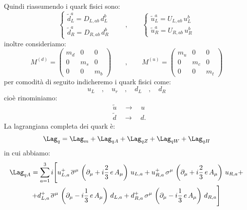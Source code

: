 Quindi riassumendo i quark fisici sono:
\begin{equation}
    \begin{cases}
        \tilde{d}_L^a = D_{L,ab}\, d_L^b \\
        \tilde{d}_R^a = D_{R,ab}\, d_R^b
    \end{cases} \qquad , \qquad \begin{cases}
        \tilde{u}_L^a = U_{L,ab}\, u_L^b \\
        \tilde{u}_R^a = U_{R,ab}\, u_R^b
    \end{cases}
\end{equation}
inoltre consideriamo:
\begin{equation}
    M^{(d)} = \begin{pmatrix}
        m_d & 0 & 0 \\
        0 & m_s & 0 \\
        0 & 0 & m_b
    \end{pmatrix} \qquad , \qquad M^{(u)} = \begin{pmatrix}
        m_u & 0 & 0 \\
        0 & m_c & 0 \\
        0 & 0 & m_t
    \end{pmatrix}
\end{equation}
per comodità di seguito indicheremo i quark fisici come:
\begin{equation}
    u_L \quad , \quad u_r \quad , \quad d_L \quad , \quad d_R
\end{equation}
cioè rinominiamo:
\begin{align}
    &\tilde{u} \quad \longrightarrow \quad u \\
    &\tilde{d} \quad \longrightarrow \quad d.
\end{align}
La lagrangiana completa dei quark è:
\begin{equation}
    \Lag_q = \Lag_m + \Lag_{qA} + \Lag_{qZ} + \Lag_{qW} + \Lag_{qH}
\end{equation}
in cui abbiamo:
\begin{multline}
    \Lag_{qA} = \sum_{a=1}^3 i \Bigg[ u_{L,a}^+\, \overline{\sigma}^\mu\, \left(\partial_\mu + i\frac{2}{3}\, e\, A_\mu\right)\, u_{L,a} + u_{R,a}^+\, \sigma^\mu\, \left(\partial_\mu + i\frac{2}{3}\, e\, A_\mu\right)\, u_{R,a} + \\
    + d_{L,a}^+\, \overline{\sigma}^\mu\, \left(\partial_\mu - i\frac{1}{3}\, e\, A_\mu\right)\, d_{L,a} + d_{R,a}^+\, \sigma^\mu\, \left(\partial_\mu - i\frac{1}{3}\, e\, A_\mu\right)\, d_{R,a} \Bigg]
\end{multline}
